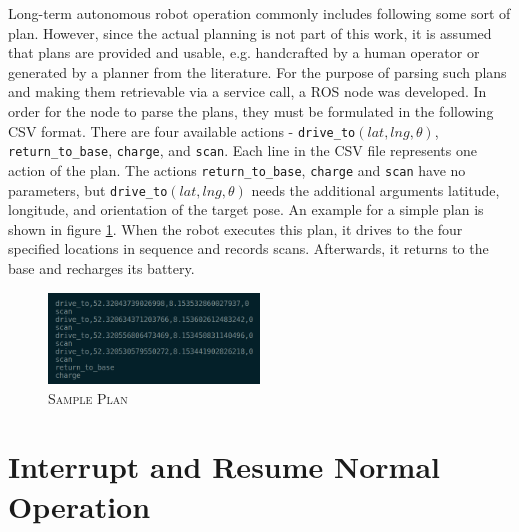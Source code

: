 \documentclass[english, master, utf8]{base/thesis_KBS}
\newcommand{\code}[1]{\colorbox{light-gray}{\texttt{#1}}}
\begin{document}
Long-term autonomous robot operation commonly includes following some sort of plan. However, since the actual planning is not part of this work, it is assumed that
plans are provided and usable, e.g. handcrafted by a human operator or generated by a planner from the literature.
For the purpose of parsing such plans and making them retrievable via a service call, a ROS node was developed.
In order for the node to parse the plans, they must be formulated in the following CSV format.
There are four available actions - \code{drive\_to$(lat, lng, \theta)$}, \code{return\_to\_base}, \code{charge}, and \code{scan}.
Each line in the CSV file represents one action of the plan. The actions \code{return\_to\_base}, \code{charge} and \code{scan} have no parameters,
but \code{drive\_to$(lat, lng, \theta)$} needs the additional arguments latitude, longitude, and orientation of the target pose.
An example for a simple plan is shown in figure \ref{fig:plan_example}. 
When the robot executes this plan, it drives to the four specified locations in sequence and records scans.
Afterwards, it returns to the base and recharges its battery.
\begin{figure}[H]
    \centering
    \includegraphics[width=0.5\textwidth]{pics/plan_example.png}
    \caption{\textsc{Sample Plan}}
    \label{fig:plan_example}
\end{figure}
\noindent

\section{Interrupt and Resume Normal Operation}
\end{document}
